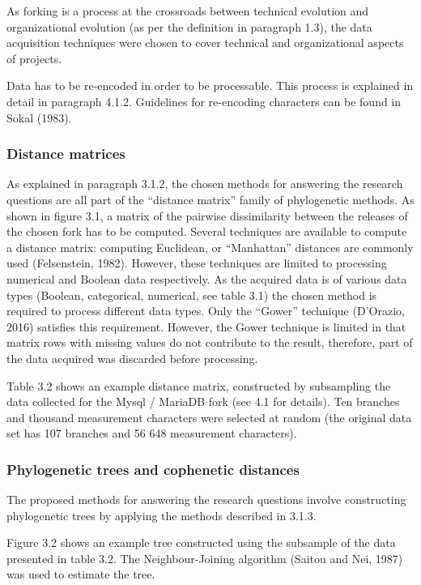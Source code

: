 As forking is a process at the crossroads between technical evolution and organizational evolution (as per the definition in paragraph 1.3), the data acquisition techniques were chosen to cover technical and organizational aspects of projects.

Data has to be re-encoded in order to be processable. This process is explained in detail in paragraph 4.1.2. Guidelines for re-encoding characters can be found in Sokal (1983).

\subsubsection{Distance matrices}
As explained in paragraph 3.1.2, the chosen methods for answering the research questions are all part of the “distance matrix” family of phylogenetic methods. As shown in figure 3.1, a matrix of the pairwise dissimilarity between the releases of the chosen fork has to be computed. Several techniques are available to compute a distance matrix: computing Euclidean, or “Manhattan” distances are commonly used (Felsenstein, 1982). However, these techniques are limited to processing numerical and Boolean data respectively. As the acquired data is of various data types (Boolean, categorical, numerical, see table 3.1) the chosen method is required to process different data types. Only the “Gower” technique (D'Orazio, 2016) satisfies this requirement. However, the Gower technique is limited in that matrix rows with missing values do not contribute to the result, therefore, part of the data acquired was discarded before processing.

Table 3.2 shows an example distance matrix, constructed by subsampling the data collected for the Mysql / MariaDB fork (see 4.1 for details). Ten branches and thousand measurement characters were selected at random (the original data set has 107 branches and 56 648 measurement characters).

\subsubsection{Phylogenetic trees and cophenetic distances}
The proposed methods for answering the research questions involve constructing phylogenetic trees by applying the methods described in 3.1.3.

Figure 3.2 shows an example tree constructed using the subsample of the data presented in table 3.2. The Neighbour-Joining algorithm (Saitou and Nei, 1987) was used to estimate the tree.


